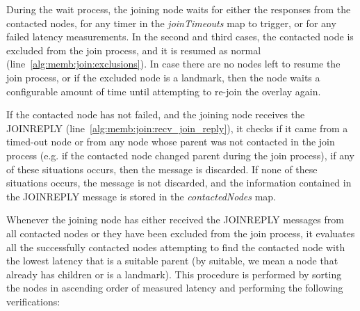 During the wait process, the joining node waits for either the responses from the contacted nodes, for any timer in the \textit{joinTimeouts} map to trigger, or for any failed latency measurements. In the second and third cases, the contacted node is excluded from the join process, and it is resumed as normal (line~\ref{alg:memb:join:exclusions}). In case there are no nodes left to resume the join process, or if the excluded node is a landmark, then the node waits a configurable amount of time until attempting to re-join the overlay again. 

If the contacted node has not failed, and the joining node receives the JOINREPLY (line~\ref{alg:memb:join:recv_join_reply}), it checks if it came from a timed-out node or from any node whose parent was not contacted in the join process (e.g. if the contacted node changed parent during the join process), if any of these situations occurs, then the message is discarded. If none of these situations occurs, the message is not discarded, and the information contained in the JOINREPLY message is stored in the \textit{contactedNodes} map.

Whenever the joining node has either received the JOINREPLY messages from all contacted nodes or they have been excluded from the join process, it evaluates all the successfully contacted nodes attempting to find the contacted node with the lowest latency that is a suitable parent (by suitable, we mean a node that already has children or is a landmark). This procedure is performed by sorting the nodes in ascending order of measured latency and performing the following verifications:

